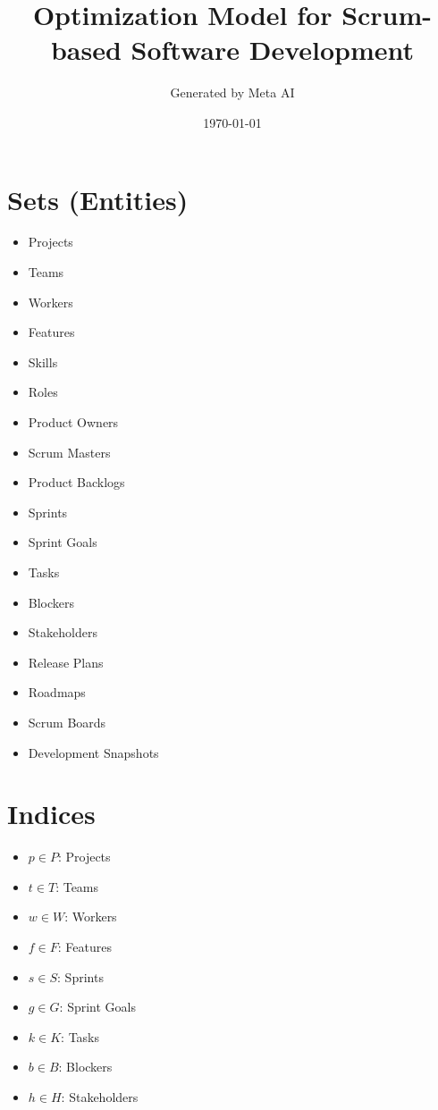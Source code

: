 \documentclass{article}
\title{Optimization Model for Scrum-based Software Development}
\author{Generated by Meta AI}
\date{\today}
\begin{document}
\maketitle
\tableofcontents

\section{Sets (Entities)}
\begin{itemize}
    \item Projects
    \item Teams
    \item Workers
    \item Features
    \item Skills
    \item Roles
    \item Product Owners
    \item Scrum Masters
    \item Product Backlogs
    \item Sprints
    \item Sprint Goals
    \item Tasks
    \item Blockers
    \item Stakeholders
    \item Release Plans
    \item Roadmaps
    \item Scrum Boards
    \item Development Snapshots
\end{itemize}

\section{Indices}
\begin{itemize}
    \item $p \in P$: Projects
    \item $t \in T$: Teams
    \item $w \in W$: Workers
    \item $f \in F$: Features
    \item $s \in S$: Sprints
    \item $g \in G$: Sprint Goals
    \item $k \in K$: Tasks
    \item $b \in B$: Blockers
    \item $h \in H$: Stakeholders
\end{itemize}
\end{document}
